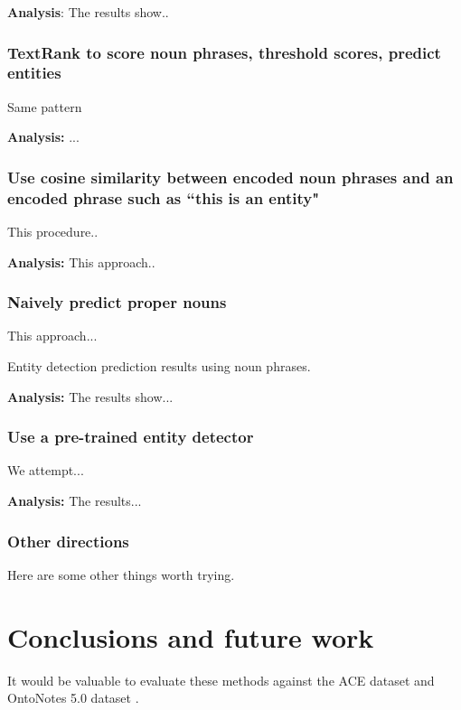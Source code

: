 \documentclass[11pt]{article} %
\begin{document}
\textbf{Analysis}: The results show..

\subsubsection{TextRank to score noun phrases, threshold scores, predict entities}
Same pattern

\textbf{Analysis:} ...

\subsubsection{Use cosine similarity between encoded noun phrases and an encoded phrase such as ``this is an entity"}

This procedure..

\textbf{Analysis:} This approach..

\subsubsection{Naively predict proper nouns}
This approach...

\begin{table}[ht]
    \centering
    
    \caption{Entity detection prediction results using noun phrases.}
    \label{tab:NNP}
\end{table}

\textbf{Analysis:} The results show...

\subsubsection{Use a pre-trained entity detector}
We attempt...

\textbf{Analysis:} The results...

\subsubsection{Other directions}

Here are some other things worth trying.

\section{Conclusions and future work}

It would be valuable to evaluate these methods against the ACE dataset \cite{ACE} and OntoNotes 5.0 dataset \cite{OntoNotes}.
\end{document}
